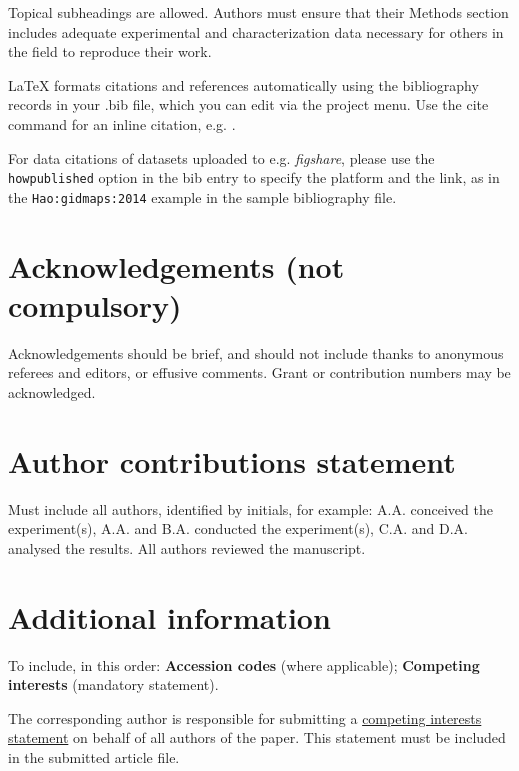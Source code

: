 \documentclass[fleqn,10pt]{wlscirep}
\begin{document}
Topical subheadings are allowed. Authors must ensure that their Methods section includes adequate experimental and characterization data necessary for others in the field to reproduce their work.



\noindent LaTeX formats citations and references automatically using the bibliography records in your .bib file, which you can edit via the project menu. Use the cite command for an inline citation, e.g.  \cite{Hao:gidmaps:2014}.

For data citations of datasets uploaded to e.g. \emph{figshare}, please use the \verb|howpublished| option in the bib entry to specify the platform and the link, as in the \verb|Hao:gidmaps:2014| example in the sample bibliography file.

\section*{Acknowledgements (not compulsory)}

Acknowledgements should be brief, and should not include thanks to anonymous referees and editors, or effusive comments. Grant or contribution numbers may be acknowledged.

\section*{Author contributions statement}

Must include all authors, identified by initials, for example:
A.A. conceived the experiment(s),  A.A. and B.A. conducted the experiment(s), C.A. and D.A. analysed the results.  All authors reviewed the manuscript. 

\section*{Additional information}

To include, in this order: \textbf{Accession codes} (where applicable); \textbf{Competing interests} (mandatory statement). 

The corresponding author is responsible for submitting a \href{http://www.nature.com/srep/policies/index.html#competing}{competing interests statement} on behalf of all authors of the paper. This statement must be included in the submitted article file.
\end{document}
